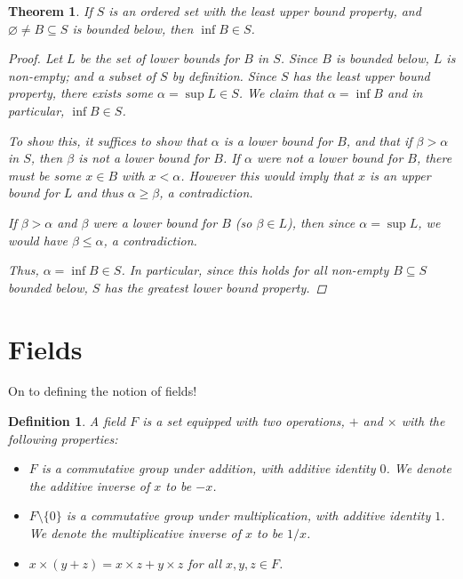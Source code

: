 \documentclass{scrbook}
\let\emptyset\varnothing
\newtheorem{theorem}{Theorem}
\newtheorem{definition}{Definition}
\begin{document}
\begin{theorem}
If $S$ is an ordered set with the least upper bound property, and $\emptyset \ne B \subseteq S$ is bounded below, then $\inf B \in S$. 
\begin{proof}
Let $L$ be the set of lower bounds for $B$ in $S$. Since $B$ is bounded below, $L$ is non-empty; and a subset of $S$ by definition. Since $S$ has the least upper bound property, there exists some $\alpha = \sup L \in S$. We claim that $\alpha = \inf B$ and in particular, $\inf B \in S$.

To show this, it suffices to show that $\alpha$ is a lower bound for $B$, and that if $\beta > \alpha$ in $S$, then $\beta$ is not a lower bound for $B$. If $\alpha$ were not a lower bound for $B$, there must be some $x \in B$ with $x < \alpha$. However this would imply that $x$ is an upper bound for $L$ and thus $\alpha \ge \beta$, a contradiction. 

If $\beta > \alpha$ and $\beta$ were a lower bound for $B$ (so $\beta \in L$), then since $\alpha = \sup L$, we would have $\beta \le \alpha$, a contradiction.

Thus, $\alpha = \inf B \in S$. In particular, since this holds for all non-empty $B \subseteq S$ bounded below, $S$ has the greatest lower bound property.
\end{proof}
\end{theorem}

\section{Fields}
On to defining the notion of fields!

\begin{definition}
A field $F$ is a set equipped with two operations, $+$ and $\times$ with the following properties:
\begin{itemize}
\item $F$ is a commutative group under addition, with additive identity $0$. We denote the additive inverse of $x$ to be $-x$.
\item $F \setminus \{0\}$ is a commutative group under multiplication, with additive identity $1$. We denote the multiplicative inverse of $x$ to be $1/x$. 
\item $x \times (y + z) = x \times z + y \times z$ for all $x, y, z \in F$. 
\end{itemize}
\end{definition}
\end{document}
